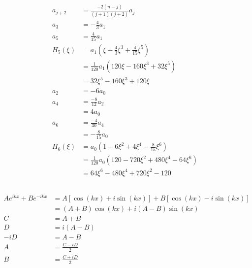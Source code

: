 \documentclass{article}
\begin{document}
\begin{align*}
  a_{j + 2} & = \frac{-2 (n - j)}{(j + 1) (j + 2)} a_j                          \\
  a_3       & = -\frac{4}{3} a_1                                                \\
  a_5       & = \frac{4}{15} a_1                                                \\
  H_5(\xi)  & = a_1 \left( \xi - \frac{4}{3} \xi^3 + \frac{4}{15} \xi^5 \right) \\
            & = \frac{1}{120} a_1 (120 \xi - 160 \xi^3 + 32 \xi^5)              \\
            & = 32 \xi^5 - 160 \xi^3 + 120 \xi                                  \\
  a_2       & = -6 a_0                                                          \\
  a_4       & = \frac{-8}{12} a_2                                               \\
            & = 4 a_0                                                           \\
  a_6       & = \frac{-4}{30} a_4                                               \\
            & = -\frac{8}{15} a_0                                               \\
  H_6(\xi)  & = a_0 \left( 1 - 6 \xi^2 + 4 \xi^4 - \frac{8}{15} \xi^6 \right)   \\
            & = \frac{1}{120} a_0 (120 - 720 \xi^2 + 480 \xi^4 - 64 \xi^6)      \\
            & = 64 \xi^6 - 480 \xi^4 + 720 \xi^2 - 120
\end{align*}

\setcounter{subsection}{16}
\subsection{}

\begin{align*}
  A e^{i k x} + B e^{-i k x} & = A [\cos (k x) + i \sin (k x)] + B [\cos (k x) - i \sin (k x)] \\
                             & = (A + B) \cos (k x) + i (A - B) \sin (k x)                     \\
  C                          & = A + B                                                         \\
  D                          & = i (A - B)                                                     \\
  -i D                       & = A - B                                                         \\
  A                          & = \frac{C - i D}{2}                                             \\
  B                          & = \frac{C + i D}{2}
\end{align*}
\end{document}
